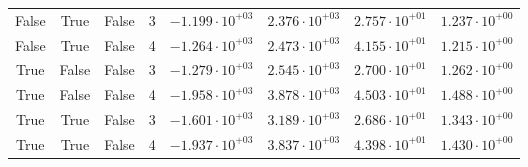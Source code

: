 \documentclass[12pt,a4paper]{article}
\begin{document}
\begin{table}
\begin{tabular}{cccccccc}
False & True & False & 3 & $-1.199 \cdot 10^{+03}$ & $2.376 \cdot 10^{+03}$ & $2.757 \cdot 10^{+01}$ & $1.237 \cdot 10^{+00}$ \\
False & True & False & 4 & $-1.264 \cdot 10^{+03}$ & $2.473 \cdot 10^{+03}$ & $4.155 \cdot 10^{+01}$ & $1.215 \cdot 10^{+00}$ \\
True & False & False & 3 & $-1.279 \cdot 10^{+03}$ & $2.545 \cdot 10^{+03}$ & $2.700 \cdot 10^{+01}$ & $1.262 \cdot 10^{+00}$ \\
True & False & False & 4 & $-1.958 \cdot 10^{+03}$ & $3.878 \cdot 10^{+03}$ & $4.503 \cdot 10^{+01}$ & $1.488 \cdot 10^{+00}$ \\
True & True & False & 3 & $-1.601 \cdot 10^{+03}$ & $3.189 \cdot 10^{+03}$ & $2.686 \cdot 10^{+01}$ & $1.343 \cdot 10^{+00}$ \\
True & True & False & 4 & $-1.937 \cdot 10^{+03}$ & $3.837 \cdot 10^{+03}$ & $4.398 \cdot 10^{+01}$ & $1.430 \cdot 10^{+00}$ \\
\bottomrule
\end{tabular}
\label{tab:DRPMExtensionDRPMPaper}
\end{table}
\end{document}
